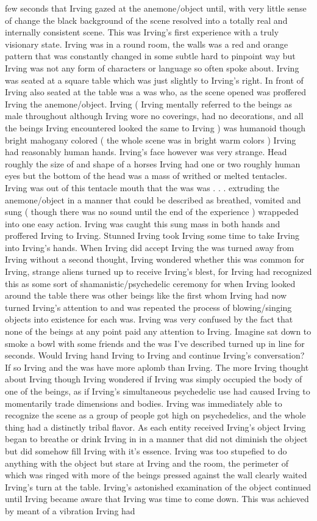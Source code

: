 \documentclass[12pt]{book}
\begin{document}
few seconds that Irving gazed at the anemone/object until, with very little sense of change the black background of the scene resolved into a totally real and internally consistent scene. This was Irving's first experience with a truly visionary state. Irving was in a round room, the walls was a red and orange pattern that was constantly changed in some subtle hard to pinpoint way but Irving was not any form of characters or language so often spoke about. Irving was seated at a square table which was just slightly to Irving's right. In front of Irving also seated at the table was a was who, as the scene opened was proffered Irving the anemone/object. Irving ( Irving mentally referred to the beings as male throughout although Irving wore no coverings, had no decorations, and all the beings Irving encountered looked the same to Irving ) was humanoid though bright mahogany colored ( the whole scene was in bright warm colors ) Irving had reasonably human hands. Irving's face however was very strange. Head roughly the size of and shape of a horses Irving had one or two roughly human eyes but the bottom of the head was a mass of writhed or melted tentacles. Irving was out of this tentacle mouth that the was was . . . extruding the anemone/object in a manner that could be described as breathed, vomited and sung ( though there was no sound until the end of the experience ) wrappeded into one easy action. Irving was caught this sung mass in both hands and proffered Irving to Irving. Stunned Irving took Irving some time to take Irving into Irving's hands. When Irving did accept Irving the was turned away from Irving without a second thought, Irving wondered whether this was common for Irving, strange aliens turned up to receive Irving's blest, for Irving had recognized this as some sort of shamanistic/psychedelic ceremony for when Irving looked around the table there was other beings like the first whom Irving had now turned Irving's attention to and was repeated the process of blowing/singing objects into existence for each was. Irving was very confused by the fact that none of the beings at any point paid any attention to Irving. Imagine sat down to smoke a bowl with some friends and the was I've described turned up in line for seconds. Would Irving hand Irving to Irving and continue Irving's conversation? If so Irving and the was have more aplomb than Irving. The more Irving thought about Irving though Irving wondered if Irving was simply occupied the body of one of the beings, as if Irving's simultaneous psychedelic use had caused Irving to momentarily trade dimensions and bodies. Irving was immediately able to recognize the scene as a group of people got high on psychedelics, and the whole thing had a distinctly tribal flavor. As each entity received Irving's object Irving began to breathe or drink Irving in in a manner that did not diminish the object but did somehow fill Irving with it's essence. Irving was too stupefied to do anything with the object but stare at Irving and the room, the perimeter of which was ringed with more of the beings pressed against the wall clearly waited Irving's turn at the table. Irving's astonished examination of the object continued until Irving became aware that Irving was time to come down. This was achieved by meant of a vibration Irving had 
\end{document}
